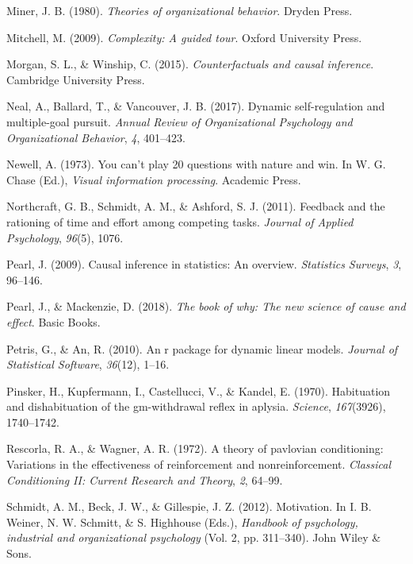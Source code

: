 \documentclass[english,,man]{apa6}
\theoremstyle{definition}
\theoremstyle{definition}
\theoremstyle{definition}
\theoremstyle{remark}
\begin{document}
\leavevmode\hypertarget{ref-miner1980}{}%
Miner, J. B. (1980). \emph{Theories of organizational behavior}. Dryden
Press.

\leavevmode\hypertarget{ref-mitchell2009}{}%
Mitchell, M. (2009). \emph{Complexity: A guided tour}. Oxford University
Press.

\leavevmode\hypertarget{ref-morgan2015}{}%
Morgan, S. L., \& Winship, C. (2015). \emph{Counterfactuals and causal
inference}. Cambridge University Press.

\leavevmode\hypertarget{ref-neal2017dynamic}{}%
Neal, A., Ballard, T., \& Vancouver, J. B. (2017). Dynamic
self-regulation and multiple-goal pursuit. \emph{Annual Review of
Organizational Psychology and Organizational Behavior}, \emph{4},
401--423.

\leavevmode\hypertarget{ref-newell1973}{}%
Newell, A. (1973). You can't play 20 questions with nature and win. In
W. G. Chase (Ed.), \emph{Visual information processing}. Academic Press.

\leavevmode\hypertarget{ref-northcraft2011feedback}{}%
Northcraft, G. B., Schmidt, A. M., \& Ashford, S. J. (2011). Feedback
and the rationing of time and effort among competing tasks.
\emph{Journal of Applied Psychology}, \emph{96}(5), 1076.

\leavevmode\hypertarget{ref-Pearl2009}{}%
Pearl, J. (2009). Causal inference in statistics: An overview.
\emph{Statistics Surveys}, \emph{3}, 96--146.

\leavevmode\hypertarget{ref-pearl2018book}{}%
Pearl, J., \& Mackenzie, D. (2018). \emph{The book of why: The new
science of cause and effect}. Basic Books.

\leavevmode\hypertarget{ref-petris2010r}{}%
Petris, G., \& An, R. (2010). An r package for dynamic linear models.
\emph{Journal of Statistical Software}, \emph{36}(12), 1--16.

\leavevmode\hypertarget{ref-pinsker1970}{}%
Pinsker, H., Kupfermann, I., Castellucci, V., \& Kandel, E. (1970).
Habituation and dishabituation of the gm-withdrawal reflex in aplysia.
\emph{Science}, \emph{167}(3926), 1740--1742.

\leavevmode\hypertarget{ref-rescorla1972}{}%
Rescorla, R. A., \& Wagner, A. R. (1972). A theory of pavlovian
conditioning: Variations in the effectiveness of reinforcement and
nonreinforcement. \emph{Classical Conditioning II: Current Research and
Theory}, \emph{2}, 64--99.

\leavevmode\hypertarget{ref-schmidtmotivation}{}%
Schmidt, A. M., Beck, J. W., \& Gillespie, J. Z. (2012). Motivation. In
I. B. Weiner, N. W. Schmitt, \& S. Highhouse (Eds.), \emph{Handbook of
psychology, industrial and organizational psychology} (Vol. 2, pp.
311--340). John Wiley \& Sons.
\end{document}
